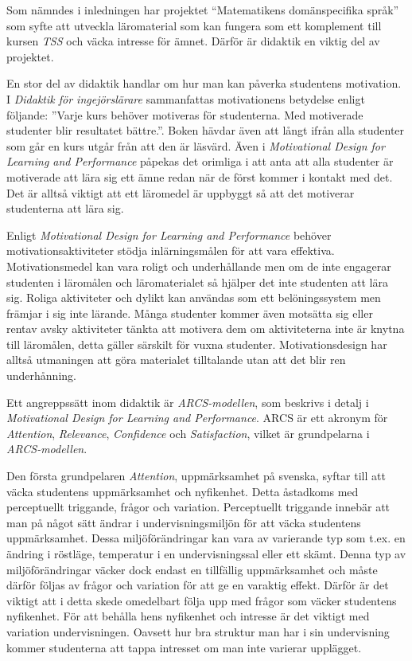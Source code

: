 \documentclass[]{article}
\begin{document}
Som nämndes i inledningen har projektet “Matematikens domänspecifika språk”
som syfte att utveckla läromaterial som kan fungera som ett komplement till
kursen \textit{TSS} och väcka intresse för ämnet.
Därför är didaktik en viktig del av projektet.

En stor del av didaktik handlar om hur man kan påverka studentens motivation.
I \textit{Didaktik för ingejörslärare} sammanfattas motivationens betydelse
enligt följande: ”Varje kurs behöver motiveras för studenterna.
Med motiverade studenter blir resultatet bättre.”.
Boken hävdar även att långt ifrån alla studenter
som går en kurs utgår från att den är läsvärd.
Även i \textit{Motivational Design for Learning and Performance} påpekas det
orimliga i att anta att alla studenter är motiverade att lära sig ett ämne
redan när de först kommer i kontakt med det.
Det är alltså viktigt att ett läromedel är uppbyggt så att det motiverar
studenterna att lära sig.

Enligt \textit{Motivational Design for Learning and Performance} behöver
motivationsaktiviteter stödja inlärningsmålen för att vara effektiva.
Motivationsmedel kan vara roligt och underhållande men om de inte engagerar
studenten i läromålen och läromaterialet så hjälper det inte studenten att
lära sig. Roliga aktiviteter och dylikt kan användas som ett belöningssystem
men främjar i sig inte lärande. Många studenter kommer även motsätta sig
eller rentav avsky aktiviteter tänkta att motivera dem om aktiviteterna
inte är knytna till läromålen, detta gäller särskilt för vuxna studenter.
Motivationsdesign har alltså utmaningen att göra materialet tilltalande
utan att det blir ren underhånning.

Ett angreppssätt inom didaktik är \textit{ARCS-modellen},
som beskrivs i detalj i
\textit{Motivational Design for Learning and Performance}.
ARCS är ett akronym för \textit{Attention}, \textit{Relevance},
\textit{Confidence} och \textit{Satisfaction}, vilket är grundpelarna
i \textit{ARCS-modellen}.

Den första grundpelaren \textit{Attention}, uppmärksamhet på svenska,
syftar till att väcka studentens uppmärksamhet och nyfikenhet.
Detta åstadkoms med perceptuellt triggande, frågor och variation.
Perceptuellt triggande innebär att man på något sätt ändrar i
undervisningsmiljön för att väcka studentens uppmärksamhet.
Dessa miljöförändringar kan vara av varierande typ som t.ex. en ändring i
röstläge, temperatur i en undervisningssal eller ett skämt.
Denna typ av miljöförändringar väcker dock endast en tillfällig uppmärksamhet
och måste därför följas av frågor och variation för att ge en varaktig effekt.
Därför är det viktigt att i detta skede omedelbart följa upp med frågor som väcker
studentens nyfikenhet. För att behålla hens nyfikenhet och
intresse är det viktigt med variation undervisningen.
Oavsett hur bra struktur man har i sin undervisning kommer studenterna att tappa
intresset om man inte varierar upplägget.
\end{document}
